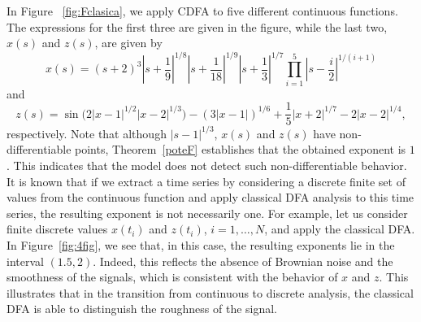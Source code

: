 \documentclass{amsart}
\begin{document}
In Figure ~\ref{fig:Fclasica}, we apply CDFA to five different continuous functions. The expressions for the first three are given in the figure, while the last two,  $x(s)$ and $z(s)$, are given  by 
\begin{equation}\label{multiplesfunc}
x(s)=
(s+2)^3
\left| s + \frac{1}{9} \right|^{1/8}
\left| s + \frac{1}{18} \right|^{1/9}
\left| s + \frac{1}{3} \right|^{1/7}
\prod_{i=1}^5
\left| s - \frac{i}{2} \right|^{1/(i+1)}
\end{equation}
and
\begin{equation}\label{multiplesfunc2}
    z(s)=\sin\bigl(2|x-1|^{1/2}|x-2|^{1/3}\bigr) - (3|x-1|)^{1/6}
    + \frac{1}{5}|x+2|^{1/7} - 2|x-2|^{1/4},
\end{equation}
respectively.
Note that although $|s-1|^{1/3}$, $x(s)$ and $z(s)$ have non-differentiable points, Theorem~\ref{poteF} establishes that the obtained exponent is $1$. This indicates that the model does not detect such non-differentiable behavior. It is known that if we extract a time series by considering a discrete finite set of values from the continuous function and apply classical DFA analysis to this time series, the resulting exponent is not necessarily one.
For example, let us consider finite discrete values $x(t_i)$ and $z(t_i)$, $i=1,\dots,N$, and apply the classical DFA. In Figure~\ref{fig:4fig}, we see that, in this case, the resulting exponents lie in the interval $(1.5,2)$. Indeed, this reflects the absence of Brownian noise and the smoothness of the signals, which is consistent with the behavior of $x$ and $z$. This illustrates that in the transition from continuous to discrete analysis, the classical DFA is able to distinguish the roughness of the signal.
\end{document}
